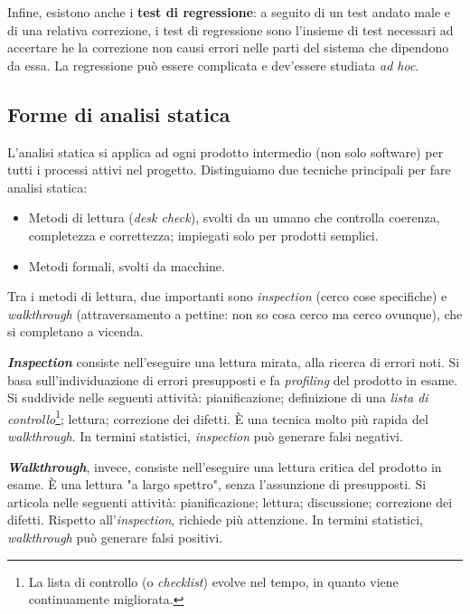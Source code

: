 \documentclass[a4paper]{article}
\begin{document}
Infine, esistono anche i \textbf{test di regressione}: a seguito di un test andato male e di una relativa correzione, i test di regressione sono l'insieme di test necessari ad accertare he la correzione non causi errori nelle parti del sistema che dipendono da essa. La regressione può essere complicata e dev'essere studiata \emph{ad hoc}.

		
	\subsection{Forme di analisi statica}

		
L'analisi statica si applica ad ogni prodotto intermedio (non solo software) per tutti i processi attivi nel progetto. Distinguiamo due tecniche principali per fare analisi statica:
		
	\begin{itemize}
		
			
	\item Metodi di lettura (\emph{desk check}), svolti da un umano che controlla coerenza, completezza e correttezza; impiegati solo per prodotti semplici.
			
	\item Metodi formali, svolti da macchine.
		
	\end{itemize}

		
Tra i metodi di lettura, due importanti sono \emph{inspection} (cerco cose specifiche) e \emph{walkthrough} (attraversamento a pettine: non so cosa cerco ma cerco ovunque), che si completano a vicenda.
		
\textbf{\emph{Inspection}} consiste nell'eseguire una lettura mirata, alla ricerca di errori noti. Si basa sull'individuazione di errori presupposti e fa \emph{profiling} del prodotto in esame. Si suddivide nelle seguenti attività: pianificazione; definizione di una \emph{lista di controllo}\footnote{La lista di controllo (o \emph{checklist}) evolve nel tempo, in quanto viene continuamente migliorata.}; lettura; correzione dei difetti. È una tecnica molto più rapida del \emph{walkthrough}. In termini statistici, \emph{inspection} può generare falsi negativi.
		
\textbf{\emph{Walkthrough}}, invece, consiste nell'eseguire una lettura critica del prodotto in esame. È una lettura "a largo spettro", senza l'assunzione di presupposti. Si articola nelle seguenti attività: pianificazione; lettura; discussione; correzione dei difetti. Rispetto all'\emph{inspection}, richiede più attenzione. In termini statistici, \emph{walkthrough} può generare falsi positivi.
\end{document}
